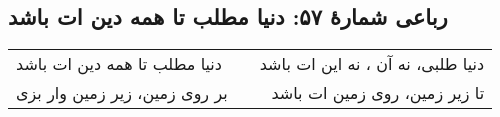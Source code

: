 \begin{center}
\section*{رباعی شمارهٔ ۵۷: دنیا مطلب تا همه دین ات باشد}
\label{sec:057}
\begin{longtable}{l p{0.5cm} r}
دنیا مطلب تا همه دین ات باشد
&&
دنیا طلبی، نه آن ، نه این ات باشد
\\
بر روی زمین، زیر زمین وار بزی
&&
تا زیر زمین، روی زمین ات باشد
\\
\end{longtable}
\end{center}

